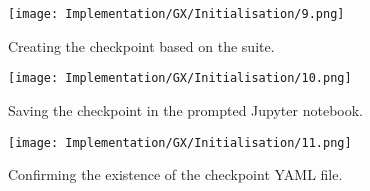 \begin{figure}[H]
    \centering
    \texttt{[image: Implementation/GX/Initialisation/9.png]}
    \caption{Creating the checkpoint based on the suite.}
    \label{fig:GXCheckpoint1}
\end{figure}

\begin{figure}[H]
    \centering
    \texttt{[image: Implementation/GX/Initialisation/10.png]}
    \caption{Saving the checkpoint in the prompted Jupyter notebook.}
    \label{fig:GXCheckpoint2}
\end{figure}

\begin{figure}[H]
    \centering
    \texttt{[image: Implementation/GX/Initialisation/11.png]}
    \caption{Confirming the existence of the checkpoint YAML file.}
    \label{fig:GXCheckpoint3}
\end{figure}

